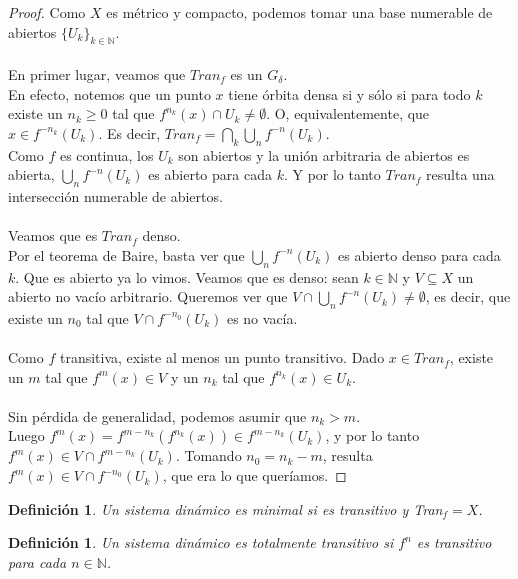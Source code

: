 \documentclass[12pt,a4paper]{article}
\newtheorem{definition}[theorem]{Definición}
\begin{document}
\begin{proof}
    Como $X$ es métrico y compacto, podemos tomar una base numerable de abiertos $\{U_k\}_{k \in \mathbb{N}}$.
    \\
    \\
    En primer lugar, veamos que $Tran_f$ es un $G_\delta$.
    \\
    En efecto, notemos que un punto $x$ tiene órbita densa si y sólo si para todo $k$ existe un $n_k \geq 0$ tal que $f^{n_k}(x) \cap U_k \neq \emptyset$. O, equivalentemente, que $x \in f^{-n_k}(U_k)$. Es decir, $\displaystyle Tran_f = \bigcap_k\bigcup_n f^{-n}(U_k)$.
    \\
    Como $f$ es continua, los $U_k$ son abiertos y la unión arbitraria de abiertos es abierta, $\displaystyle \bigcup_n f^{-n}(U_k)$ es abierto para cada $k$. Y por lo tanto $Tran_f$ resulta una intersección numerable de abiertos.
    \\
    \\
    Veamos que es $Tran_f$ denso.
    \\
    Por el teorema de Baire, basta ver que $\displaystyle \bigcup_n f^{-n}(U_k)$ es abierto denso para cada $k$. Que es abierto ya lo vimos. Veamos que es denso: sean $k \in \mathbb{N}$ y $V \subseteq X$ un abierto no vacío arbitrario. Queremos ver que $V \cap \displaystyle \bigcup_n f^{-n}(U_{k}) \neq \emptyset$, es decir, que existe un $n_0$ tal que $V \cap f^{-n_0}(U_k)$ es no vacía.
    \\
    \\
    Como $f$ transitiva, existe al menos un punto transitivo. Dado $x \in Tran_f$, existe un $m$ tal que $f^m(x) \in V$ y un $n_k$ tal que $f^{n_k}(x) \in U_{k}$.
    \\
    \\
    Sin pérdida de generalidad, podemos asumir que $n_k > m$.
    \\
    Luego $f^m(x) = f^{m-n_k}(f^{n_k}(x)) \in f^{m-n_k}(U_k)$, y por lo tanto $f^m(x) \in V \cap f^{m-n_k}(U_k)$. Tomando $n_0 = n_k - m$, resulta $f^m(x) \in V \cap f^{-n_0}(U_k)$, que era lo que queríamos.
\end{proof}
\begin{definition}
Un sistema dinámico es \textit{minimal} si es transitivo y \textit{Tran}$_{f} = X$.
\end{definition}
\begin{definition}
Un sistema dinámico es totalmente transitivo si $f^n$ es transitivo para cada $n \in \mathbb{N}$.
\end{definition}
\end{document}
